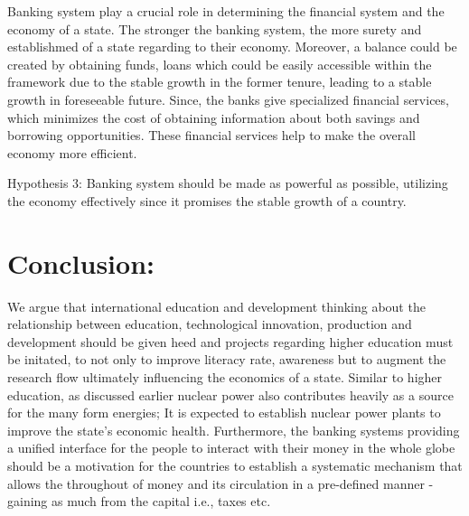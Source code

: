 \documentclass[]{article}
\begin{document}
Banking system play a crucial role in determining the financial system and the economy of a state. The stronger the banking system, the more surety and establishmed of a state regarding to their economy. Moreover, a balance could be created by obtaining funds, loans which could be easily accessible within the framework due to the stable growth in the former tenure, leading to a stable growth in foreseeable future. Since, the banks give specialized financial services, which minimizes the cost of obtaining information about both savings and borrowing opportunities. These financial services help to make the overall economy more efficient. 

Hypothesis 3: Banking system should be made as powerful as possible, utilizing the economy effectively since it promises the stable growth of a country.

\section{Conclusion:}

We argue that international education and development thinking about the relationship between education, technological innovation, production and development should be given heed and projects regarding higher education must be initated, to not only to improve literacy rate, awareness but to augment the research flow ultimately influencing the economics of a state. Similar to higher education, as discussed earlier nuclear power also contributes heavily as a source for the many form energies; It is expected to establish nuclear power plants to improve the state's economic health. Furthermore, the banking systems providing a unified interface for the people to interact with their money in the whole globe should be a motivation for the countries to establish a systematic mechanism that allows the throughout of money and its circulation in a pre-defined manner - gaining as much from the capital i.e., taxes etc.



\end{document}
